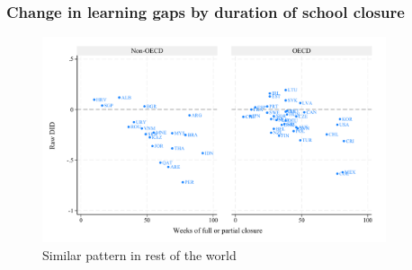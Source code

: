 \documentclass{beamer}
\begin{document}
\begin{frame}
    \label{frame:pisaclosure}
    \frametitle{Change in learning gaps by duration of school closure}
    
    \begin{figure}
        \centering
        \includegraphics[width=0.9\textwidth]{./FIGURES/Descriptive/PISA_raw_DID_PV4MATH_not_fully_open.pdf}
        \caption{Similar pattern in rest of the world}
        \label{fig:1b}
    \end{figure}

    \begin{flushleft}
        \hyperlink{frame:india}{}
    \end{flushleft}  
    
    
\end{frame}
\end{document}
